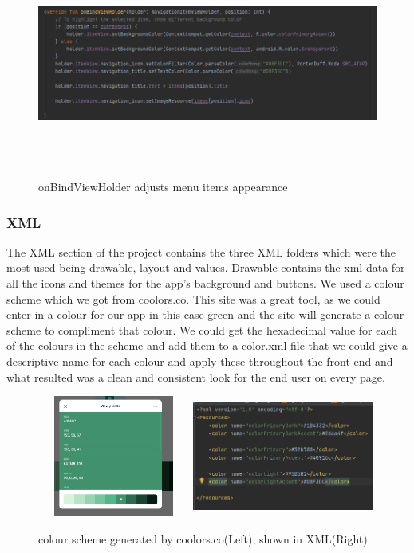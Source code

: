 \begin{figure}[H]
    \centering
    \includegraphics[width=14cm, height = 7.5cm]{img/poistion_code.PNG}
    \caption{onBindViewHolder adjusts menu items appearance}
    \label{fig:onBindViewHolder adjusts menu items appearance}
\end{figure}

\subsubsection{XML}
The XML section of the project contains the three XML folders which were the most used being drawable, layout and values. Drawable contains the xml data for all the icons and themes for the app's background and buttons. We used a colour scheme which we got from coolors.co. \cite{ref12} This site was a great tool, as we could enter in a colour for our app in this case green and the site will generate a colour scheme to compliment that colour. We could get the hexadecimal value for each of the colours in the scheme and add them to a color.xml file that we could give a descriptive name for each colour and apply these throughout the front-end and what resulted was a clean and consistent look for the end user on every page.
\begin{figure}[H]
    \centering
    \includegraphics[width=5cm, height = 4cm]{img/colour_pallete.PNG}
     \includegraphics[width=6cm, height = 4cm]{img/colors_xml_values.PNG}
    \caption{colour scheme generated by coolors.co(Left), shown in XML(Right)}
    \label{fig:colour scheme generated by coolors.co(Left), shown in XML(Right)}
\end{figure}

